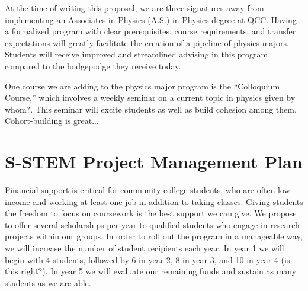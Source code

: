 \documentclass[12pt]{article}
\newcommand\new[1]{{\color{blue}#1}}
\newcommand\reword[1]{{\color{red}#1}}
\begin{document}
At the time of writing this proposal, we are \new{three signatures away} from implementing an Associates in Physics (A.S.) in Physics degree at QCC.  Having a formalized program with clear prerequisites, course requirements, and transfer expectations will greatly facilitate the creation of a pipeline of physics majors.  Students will receive improved and streamlined advising in this program, compared to the hodgepodge they receive today.  

One course we are adding to the physics major program is the ``Colloquium Course,'' which involves a weekly seminar on a current topic in physics \new{given by whom?}.  This seminar will excite students as well as build cohesion among them.  \new{Cohort-building is great...}

\section{S-STEM Project Management Plan}




Financial support is critical for community college students, who are often low-income and working at least one job in addition to taking classes.  Giving students the freedom to focus on coursework is the best support we can give.  We propose to offer several scholarships per year to qualified students who engage in research projects within our groups.  In order to roll out the program in a manageable way, we will increase the number of student recipients each year.  In year 1 we will begin with 4 students, followed by 6 in year 2, 8 in year 3, and 10 in year 4 \reword{(is this right?)}.  In year 5 we will evaluate our remaining funds and sustain as many students as we are able.
\end{document}
